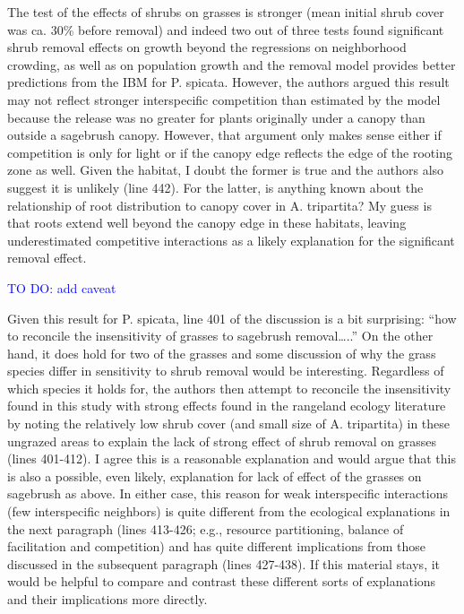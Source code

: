 \documentclass[12pt]{article}
\newcommand{\response}{\textcolor{blue}}
\begin{document}
The test of the effects of shrubs on grasses is stronger (mean initial shrub cover was ca. 30\% before
removal) and indeed two out of three tests found significant shrub removal effects on growth beyond
the regressions on neighborhood crowding, as well as on population growth and the removal model
provides better predictions from the IBM for P. spicata. However, the authors argued this result may
not reflect stronger interspecific competition than estimated by the model because the release was no
greater for plants originally under a canopy than outside a sagebrush canopy. However, that argument
only makes sense either if competition is only for light or if the canopy edge reflects the edge of the
rooting zone as well. Given the habitat, I doubt the former is true and the authors also suggest it is
unlikely (line 442). For the latter, is anything known about the relationship of root distribution to
canopy cover in A. tripartita? My guess is that roots extend well beyond the canopy edge in these
habitats, leaving underestimated competitive interactions as a likely explanation for the significant
removal effect.

\response{TO DO: add caveat}

Given this result for P. spicata, line 401 of the discussion is a bit surprising: “how to reconcile the
insensitivity of grasses to sagebrush removal…..” On the other hand, it does hold for two of the grasses
and some discussion of why the grass species differ in sensitivity to shrub removal would be interesting.
Regardless of which species it holds for, the authors then attempt to reconcile the insensitivity found in
this study with strong effects found in the rangeland ecology literature by noting the relatively low shrub
cover (and small size of A. tripartita) in these ungrazed areas to explain the lack of strong effect of shrub
removal on grasses (lines 401-412). I agree this is a reasonable explanation and would argue that this is
also a possible, even likely, explanation for lack of effect of the grasses on sagebrush as above. In either
case, this reason for weak interspecific interactions (few interspecific neighbors) is quite different from
the ecological explanations in the next paragraph (lines 413-426; e.g., resource partitioning, balance of
facilitation and competition) and has quite different implications from those discussed in the
subsequent paragraph (lines 427-438). If this material stays, it would be helpful to compare and
contrast these different sorts of explanations and their implications more directly.
\end{document}
